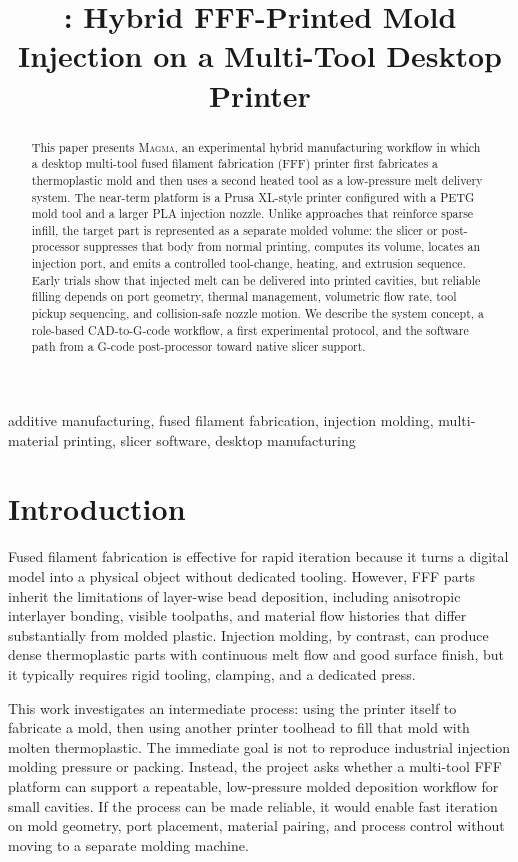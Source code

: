 \documentclass[conference]{IEEEtran}
\title{\magma: Hybrid FFF-Printed Mold Injection on a Multi-Tool Desktop Printer}
\author{
\IEEEauthorblockN{Ethan Childerhose, Collaborators and not Brian Machado}
\IEEEauthorblockA{
Bracket Bot Research \\
San Francisco, CA, USA \\
June 2026 internal research draft}
}
\newcommand{\magma}{\textsc{Magma}}
\begin{document}
\maketitle

\begin{abstract}
This paper presents \magma, an experimental hybrid manufacturing workflow in which a desktop multi-tool fused filament fabrication (FFF) printer first fabricates a thermoplastic mold and then uses a second heated tool as a low-pressure melt delivery system. The near-term platform is a Prusa XL-style printer configured with a PETG mold tool and a larger PLA injection nozzle. Unlike approaches that reinforce sparse infill, the target part is represented as a separate molded volume: the slicer or post-processor suppresses that body from normal printing, computes its volume, locates an injection port, and emits a controlled tool-change, heating, and extrusion sequence. Early trials show that injected melt can be delivered into printed cavities, but reliable filling depends on port geometry, thermal management, volumetric flow rate, tool pickup sequencing, and collision-safe nozzle motion. We describe the system concept, a role-based CAD-to-G-code workflow, a first experimental protocol, and the software path from a G-code post-processor toward native slicer support.
\end{abstract}

\begin{IEEEkeywords}
additive manufacturing, fused filament fabrication, injection molding, multi-material printing, slicer software, desktop manufacturing
\end{IEEEkeywords}

\section{Introduction}
Fused filament fabrication is effective for rapid iteration because it turns a digital model into a physical object without dedicated tooling. However, FFF parts inherit the limitations of layer-wise bead deposition, including anisotropic interlayer bonding, visible toolpaths, and material flow histories that differ substantially from molded plastic. Injection molding, by contrast, can produce dense thermoplastic parts with continuous melt flow and good surface finish, but it typically requires rigid tooling, clamping, and a dedicated press.

This work investigates an intermediate process: using the printer itself to fabricate a mold, then using another printer toolhead to fill that mold with molten thermoplastic. The immediate goal is not to reproduce industrial injection molding pressure or packing. Instead, the project asks whether a multi-tool FFF platform can support a repeatable, low-pressure molded deposition workflow for small cavities. If the process can be made reliable, it would enable fast iteration on mold geometry, port placement, material pairing, and process control without moving to a separate molding machine.
\end{document}
